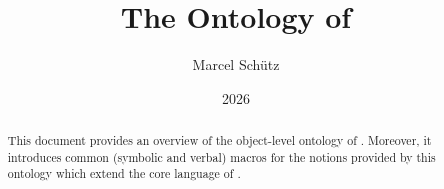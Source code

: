 \documentclass{stex}
\title{The Ontology of \Naproche}
\author{Marcel Schütz}
\date{2026}
\begin{document}

\maketitle

\begin{abstract}
  \noindent
  This document provides an overview of the object-level ontology of \Naproche.
  Moreover, it introduces common (symbolic and verbal) macros for the notions
  provided by this ontology which extend the core language of \ForTheL.
\end{abstract}

\tableofcontents


\end{document}
